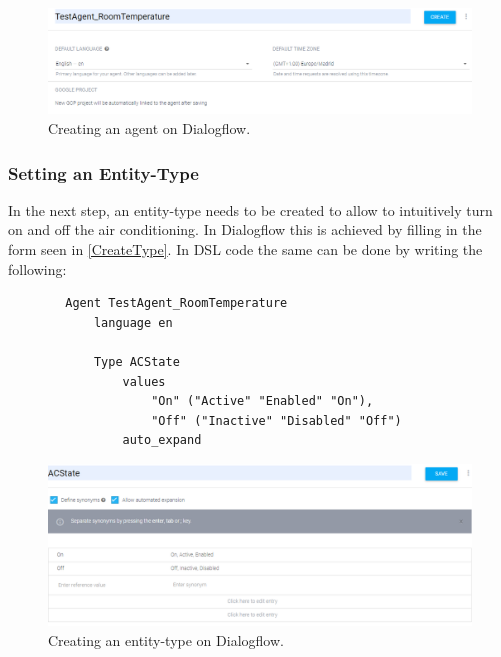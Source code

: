 \begin{figure}[ht]
    \centering
    \includegraphics[width=1\textwidth]{Thesis_Images/CreateAgent.PNG}
    \caption{Creating an agent on Dialogflow.}
        \label{CreateAgent}
\end{figure}

\subsubsection{Setting an Entity-Type}
In the next step, an entity-type needs to be created to allow to intuitively turn on and off the air conditioning.
In Dialogflow this is achieved by filling in the form seen in \autoref{CreateType}.
In DSL code the same can be done by writing the following:
\begin{samepage}    
    \begin{verbatim}
        Agent TestAgent_RoomTemperature
            language en 
        
            Type ACState
                values 
                    "On" ("Active" "Enabled" "On"),
                    "Off" ("Inactive" "Disabled" "Off")
                auto_expand
    \end{verbatim}
\end{samepage}

\begin{figure}[ht]
    \centering
    \includegraphics[width=1\textwidth]{Thesis_Images/CreateType.PNG}
    \caption{Creating an entity-type on Dialogflow.}
        \label{CreateType}
\end{figure}

